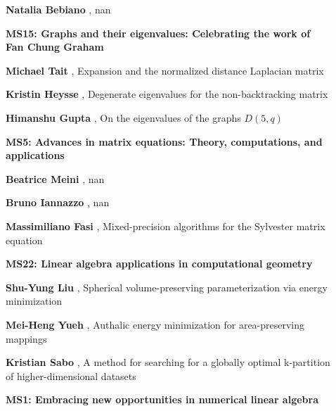 \documentclass[ILAS2025-program.tex]{subfiles}
\begin{document}
\begin{description}
\begin{description}
        \item[] \textbf{Natalia Bebiano} , nan
        \end{description}
    \begin{description}
    \item[] {\color{mstitle}\textbf{MS15: Graphs and their eigenvalues: Celebrating the work of Fan Chung Graham}} 
    \item[] \textbf{Michael Tait} , Expansion and the normalized distance Laplacian matrix
        \item[] \textbf{Kristin Heysse} , Degenerate eigenvalues for the non-backtracking matrix
        \item[] \textbf{Himanshu Gupta} , On the eigenvalues of the graphs $D(5, q)$
        \end{description}
    \begin{description}
    \item[] {\color{mstitle}\textbf{MS5: Advances in matrix equations: Theory, computations, and applications}} 
    \item[] \textbf{Beatrice Meini} , nan
        \item[] \textbf{Bruno Iannazzo} , nan
        \item[] \textbf{Massimiliano Fasi} , Mixed-precision algorithms for the Sylvester matrix equation
        \end{description}
    \begin{description}
    \item[] {\color{mstitle}\textbf{MS22: Linear algebra applications in computational geometry}} 
    \item[] \textbf{Shu-Yung Liu} , Spherical volume-preserving parameterization via energy minimization
        \item[] \textbf{Mei-Heng Yueh} , Authalic energy minimization for area-preserving mappings
        \item[] \textbf{Kristian Sabo} , A method for searching for a globally optimal k-partition of higher-dimensional datasets
        \end{description}
    \begin{description}
    \item[] {\color{mstitle}\textbf{MS1: Embracing new opportunities in numerical linear algebra}} 

\end{description}
\end{description}
\end{document}

